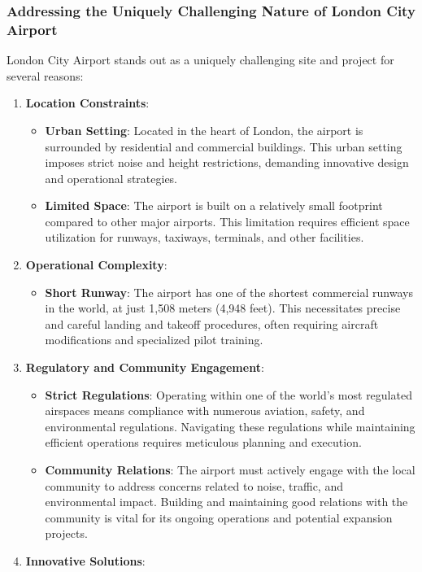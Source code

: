 \documentclass[
]{article}
\providecommand{\tightlist}{%
  \setlength{\itemsep}{0pt}\setlength{\parskip}{0pt}}\usepackage{longtable,booktabs,array}
\begin{document}
\subsubsection{Addressing the Uniquely Challenging Nature of London City
Airport}\label{addressing-the-uniquely-challenging-nature-of-london-city-airport}

London City Airport stands out as a uniquely challenging site and
project for several reasons:

\begin{enumerate}
\def\labelenumi{\arabic{enumi}.}
\tightlist
\item
  \textbf{Location Constraints}:

  \begin{itemize}
  \tightlist
  \item
    \textbf{Urban Setting}: Located in the heart of London, the airport
    is surrounded by residential and commercial buildings. This urban
    setting imposes strict noise and height restrictions, demanding
    innovative design and operational strategies.
  \item
    \textbf{Limited Space}: The airport is built on a relatively small
    footprint compared to other major airports. This limitation requires
    efficient space utilization for runways, taxiways, terminals, and
    other facilities.
  \end{itemize}
\item
  \textbf{Operational Complexity}:

  \begin{itemize}
  \tightlist
  \item
    \textbf{Short Runway}: The airport has one of the shortest
    commercial runways in the world, at just 1,508 meters (4,948 feet).
    This necessitates precise and careful landing and takeoff
    procedures, often requiring aircraft modifications and specialized
    pilot training.
  \end{itemize}
\item
  \textbf{Regulatory and Community Engagement}:

  \begin{itemize}
  \tightlist
  \item
    \textbf{Strict Regulations}: Operating within one of the world's
    most regulated airspaces means compliance with numerous aviation,
    safety, and environmental regulations. Navigating these regulations
    while maintaining efficient operations requires meticulous planning
    and execution.
  \item
    \textbf{Community Relations}: The airport must actively engage with
    the local community to address concerns related to noise, traffic,
    and environmental impact. Building and maintaining good relations
    with the community is vital for its ongoing operations and potential
    expansion projects.
  \end{itemize}
\item
  \textbf{Innovative Solutions}:


\end{enumerate}
\end{document}
